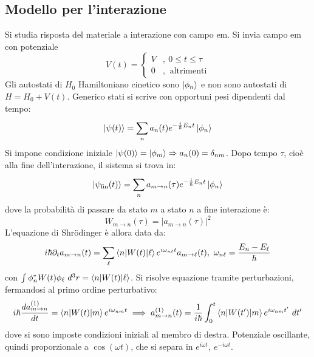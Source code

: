 \documentclass[10pt, a4paper]{scrartcl}
\numberwithin{equation}{subsection}
\theoremstyle{style1}
\theoremstyle{style2}
\begin{document}
\subsection{Modello per l'interazione}
Si studia risposta del materiale a interazione con campo em. Si invia campo em con potenziale
\begin{equation}
	V(t) = \begin{cases}
		V &, \ 0\le  t\le \tau \\
		0 & , \ \text{ altrimenti}
	\end{cases}
\end{equation}
Gli autostati di $H_0$ Hamiltoniano cinetico sono $\ket{\phi _n} $ e non sono autostati di $H = H_0 + V(t)$. 
Generico stati si scrive con opportuni pesi dipendenti dal tempo:
\begin{equation}
	\ket{\psi (t)}  = \sum_{n}^{} a_n(t) e^{ - \frac{i}{\hbar }E_n t } \ket{\phi _n} 
\end{equation}
Si impone condizione iniziale $\ket{\psi (0)}  = \ket{\phi _m} \Rightarrow  a_n(0) = \delta _{nm} $. Dopo tempo $\tau $, cio\`e alla fine dell'interazione, il sistema si trova in:
\begin{equation}
	\ket{\psi _\text{fin}(t)}  = \sum_{n}^{} a_{m\to n} (\tau ) e^{ - \frac{i}{\hbar }E_n t } \ket{\phi _n} 
\end{equation}
dove la probabilit\`a di passare da stato $m$ a stato $n$ a fine interazione \`e:
\begin{equation}
	W_{m\to n} (\tau ) = \lvert a_{m\to n} (\tau ) \rvert ^2
\end{equation}
L'equazione di Shr\"odinger \`e allora data da:
\begin{equation}
	i \hbar  \partial _t a_{m\to n} (t) = \sum_{\ell }^{} \braket{n|W(t)|\ell } e^{i \omega_{n\ell } t} a_{m\to \ell } (t), \ \omega_{n\ell } = \frac{E_n - E_\ell }{\hbar }
\end{equation}
con $\int \phi _n^* W(t) \phi _\ell \ d^3 r = \braket{n|W(t)|\ell } $. 
Si risolve equazione tramite perturbazioni, fermandosi al primo ordine perturbativo:
\begin{equation}
	i\hbar \frac{d a^{(1)} _{m\to n} }{d t} = \braket{n|W(t)|m} e^{i \omega_{nm} t} \implies a^{(1)} _{m\to n} (t) = \frac{1}{i\hbar }\int_{0} ^t \braket{n|W(t')|m} e^{ i \omega_{nm} t'} \ dt'
\end{equation}
dove si sono imposte condizioni iniziali al membro di destra.
Potenziale oscillante, quindi proporzionale a $\cos(\omega t)$, che si separa in $e^{i\omega t }, \ e^{-i\omega t} $.
\end{document}

